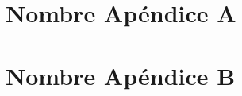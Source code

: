 \documentclass[11pt]{article}
\begin{document}
\section{Nombre Apéndice A}\label{ApendiceA} %


\clearpage
\newpage
{}
\def \nombreapendice{B}
\formatoapendice
\seteocontadores
\section{Nombre Apéndice B}\label{Apendice B}


\clearpage
\newpage
{}
\seteocontadores
\rfoot{ }


\end{document}

